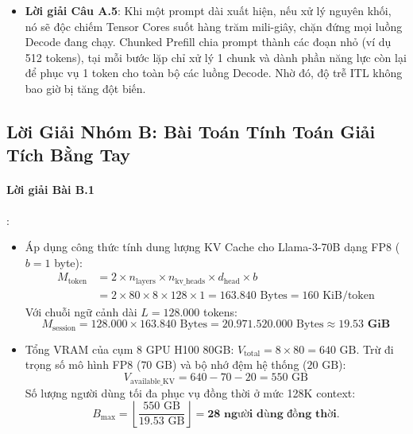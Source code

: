 \begin{itemize}
  \item \textbf{Lời giải Câu A.5}:
  Khi một prompt dài xuất hiện, nếu xử lý nguyên khối, nó sẽ độc chiếm Tensor Cores suốt hàng trăm mili-giây, chặn đứng mọi luồng Decode đang chạy. Chunked Prefill chia prompt thành các đoạn nhỏ (ví dụ 512 tokens), tại mỗi bước lặp chỉ xử lý 1 chunk và dành phần năng lực còn lại để phục vụ 1 token cho toàn bộ các luồng Decode. Nhờ đó, độ trễ ITL không bao giờ bị tăng đột biến.
\end{itemize}

\subsection{Lời Giải Nhóm B: Bài Toán Tính Toán Giải Tích Bằng Tay}

\paragraph{Lời giải Bài B.1}:
\begin{itemize}
  \item[a)] Áp dụng công thức tính dung lượng KV Cache cho Llama-3-70B dạng FP8 ($b=1$ byte):
  \begin{align*}
  M_{\text{token}} &= 2 \times n_{\text{layers}} \times n_{\text{kv\_heads}} \times d_{\text{head}} \times b \\
  &= 2 \times 80 \times 8 \times 128 \times 1 = 163.840\text{ Bytes} = 160\text{ KiB/token}
  \end{align*}
  Với chuỗi ngữ cảnh dài $L = 128.000$ tokens:
  \begin{equation*}
  M_{\text{session}} = 128.000 \times 163.840\text{ Bytes} = 20.971.520.000\text{ Bytes} \approx \mathbf{19.53\text{ GiB}}
  \end{equation*}

  \item[b)] Tổng VRAM của cụm 8 GPU H100 80GB: $V_{\text{total}} = 8 \times 80 = 640\text{ GB}$.
  Trừ đi trọng số mô hình FP8 ($70\text{ GB}$) và bộ nhớ đệm hệ thống ($20\text{ GB}$):
  \begin{equation*}
  V_{\text{available\_KV}} = 640 - 70 - 20 = 550\text{ GB}
  \end{equation*}
  Số lượng người dùng tối đa phục vụ đồng thời ở mức 128K context:
  \begin{equation*}
  B_{\max} = \left\lfloor \frac{550\text{ GB}}{19.53\text{ GB}} \right\rfloor = \mathbf{28\text{ người dùng đồng thời}}.
  \end{equation*}
\end{itemize}

